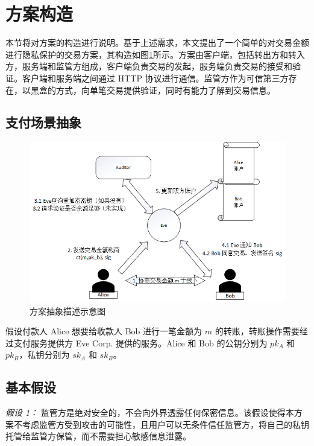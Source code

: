 \section{方案构造}

本节将对方案的构造进行说明。基于上述需求，本文提出了一个简单的对交易金额进行隐私保护的交易方案，其构造如图\ref{Fig:chimata_abstract_transaction}所示。方案由客户端，包括转出方和转入方，服务端和监管方组成，客户端负责交易的发起，服务端负责交易的接受和验证。客户端和服务端之间通过 HTTP 协议进行通信。监管方作为可信第三方存在，以黑盒的方式，向单笔交易提供验证，同时有能力了解到交易信息。

\subsection{支付场景抽象}

\begin{figure}
    \centering
    \includegraphics[width=0.9\linewidth]{Figures/chimata-transaction-abstract.png}
    \caption{方案抽象描述示意图}\label{Fig:chimata_abstract_transaction}
\end{figure}

假设付款人 Alice 想要给收款人 Bob 进行一笔金额为 $m$ 的转账，转账操作需要经过支付服务提供方 Eve Corp. 提供的服务。Alice 和 Bob 的公钥分别为 $pk_A$ 和 $pk_B$，私钥分别为 $sk_A$ 和 $sk_B$。

\subsection{基本假设}

\textit{假设 1：} 监管方是绝对安全的，不会向外界透露任何保密信息。该假设使得本方案不考虑监管方受到攻击的可能性，且用户可以无条件信任监管方，将自己的私钥托管给监管方保管，而不需要担心敏感信息泄露。

